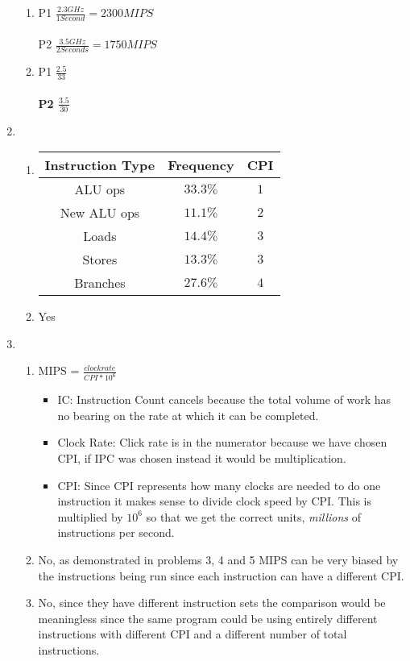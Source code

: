 \documentclass[a4paper]{article}
\begin{document}
\begin{enumerate}
\begin{enumerate}
\item P1 $\frac {2.3GHz}{1 Second} = 2300 MIPS$
\\
\\
P2 $\frac {3.5GHz}{2 Seconds} = 1750 MIPS$
\item P1 $\frac {2.5}{33}$
\\
\\
\textbf{P2 $\frac {3.5}{30}$}
\end{enumerate}
\item
\begin{enumerate}
\item
\begin{tabular}{|c|c|c|} 
\hline 
Instruction Type&Frequency&CPI\\  
\hline
ALU ops&$33.3\%$&$1$\\ 
\hline
New ALU ops&$11.1\%$&$2$\\  
\hline
Loads&$14.4\%$&$3$\\
\hline
Stores&$13.3\%$&$3$\\
\hline 
Branches&$27.6\%$&$4$\\
\hline 
\end{tabular}
\item Yes
\end{enumerate}
\item
\begin{enumerate}
\item MIPS = $\frac {clockrate}{CPI * 10^6}$
\begin{itemize}
\item IC: Instruction Count cancels because the total volume of work has no bearing on the rate at which it can be completed.
\item Clock Rate: Click rate is in the numerator because we have chosen CPI, if IPC was chosen instead it would be multiplication.
\item CPI: Since CPI represents how many clocks are needed to do one instruction it makes sense to divide clock speed by CPI. This is multiplied by $10^6$ so that we get the correct units, \textit{millions} of instructions per second.
\end{itemize}
\item No, as demonstrated in problems 3, 4 and 5 MIPS can be very biased by the instructions being run since each instruction can have a different CPI.
\item No, since they have different instruction sets the comparison would be meaningless since the same program could be using entirely different instructions with different CPI and a different number of total instructions.

\end{enumerate}
\end{enumerate}
\end{document}
